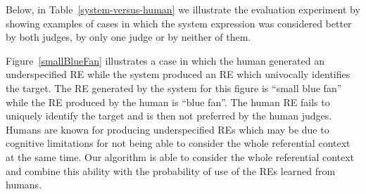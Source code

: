 

Below, in Table~\ref{system-versus-human} we illustrate the evaluation experiment by showing examples of cases in which the system expression was considered better by both judges, by only one judge or by neither of them. 

Figure~\ref{smallBlueFan} illustrates a case in which the human generated an underspecified RE while the system produced an RE which univocally identifies the target. The RE generated by the system for this figure is ``small blue fan'' while the RE produced by the human is ``blue fan''. The human RE fails to uniquely identify the target and is then not preferred by the human judges. Humans are known for producing underspecified REs which may be due to cognitive limitations for not being able to consider the whole referential context at the same time. Our algorithm is able to consider the whole referential context and combine this ability with the probability of use of the REs learned from humans. 

